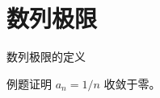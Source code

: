 \documentclass[10pt,aspectratio=169,fontset=fandol]{ctexbeamer}
\begin{document}
\section{数列极限}
\begin{frame}{数列极限的定义}
\begin{block}{例题}\normalsize 证明 $a_n=1/n$ 收敛于零。\end{block}
\end{frame}
\end{document}
